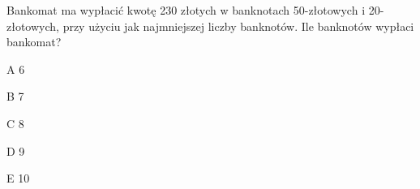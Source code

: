 \begin{tresc}
Bankomat ma wypłacić kwotę 230 złotych w banknotach 50-złotowych i 20-złotowych, przy użyciu jak najmniejszej liczby banknotów. Ile banknotów wypłaci bankomat?
\end{tresc}
\begin{wariant}{A} 6 \end{wariant}
\begin{wariant}{B} 7 \end{wariant}
\begin{wariant}{C} 8 \end{wariant}
\begin{wariant}{D} 9 \end{wariant}
\begin{wariant}{E} 10 \end{wariant}
